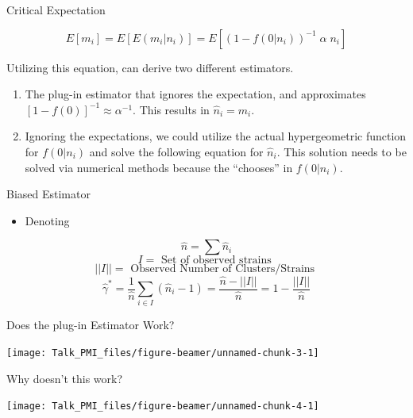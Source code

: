 \documentclass[ignorenonframetext,]{beamer}
\providecommand{\tightlist}{%
  \setlength{\itemsep}{0pt}\setlength{\parskip}{0pt}}
\begin{document}
\begin{frame}{Critical Expectation}
\protect\hypertarget{critical-expectation}{}

\[E[m_i] = E[ E(m_i|n_i)] = E[ (1-f(0|n_i))^{-1} \;\alpha \;n_i]\]

Utilizing this equation, can derive two different estimators.

\begin{enumerate}
\tightlist
\item
  The plug-in estimator that ignores the expectation, and approximates
  \(\left[ 1-f(0)\right]^{-1} \approx \alpha^{-1}\). This results in
  \(\widehat{n}_i = m_i\).
\item
  Ignoring the expectations, we could utilize the actual hypergeometric
  function for \(f(0|n_i)\) and solve the following equation for
  \(\widehat{n}_i\). This solution needs to be solved via numerical
  methods because the ``chooses'' in \(f(0|n_i)\).
\end{enumerate}

\end{frame}

\begin{frame}{Biased Estimator}
\protect\hypertarget{biased-estimator}{}

\begin{itemize}
\tightlist
\item
  Denoting
\end{itemize}

\[\widehat{n} = \sum\widehat{n}_i\]
\[ I = \textrm{ Set of observed strains }\]
\[ ||I|| = \textrm{ Observed Number of Clusters/Strains }\]
\[\widehat{\gamma}^* = \frac{1}{\widehat{n}}\sum_{i\in I} (\widehat{n}_i-1) = \frac{\widehat{n} - ||I||}{\widehat{n}} = 1-\frac{||I||}{\widehat{n}}\]

\end{frame}

\begin{frame}{Does the plug-in Estimator Work?}
\protect\hypertarget{does-the-plug-in-estimator-work}{}

\begin{center}\texttt{[image: Talk\_PMI\_files/figure-beamer/unnamed-chunk-3-1]} \end{center}

\end{frame}

\begin{frame}{Why doesn't this work?}
\protect\hypertarget{why-doesnt-this-work}{}

\begin{center}\texttt{[image: Talk\_PMI\_files/figure-beamer/unnamed-chunk-4-1]} \end{center}

\end{frame}
\end{document}

